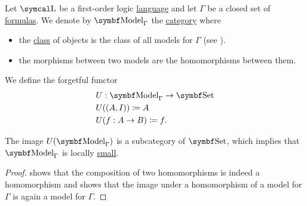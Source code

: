 \begin{definition}\label{def:first_order_model_category}
  Let \( \CL \) be a first-order logic \hyperref[def:first_order_logic_language]{language} and let \( \Gamma \) be a closed set of \hyperref[def:first_order_theory]{formulas}. We denote by \( \Cat{Model}_\Gamma \) the \hyperref[def:category]{category} where
  \begin{itemize}
    \item the \hyperref[def:set_zfc]{class} of objects is the class of all models for \( \Gamma \) (see ).
    \item the morphisms between two models are the homomorphisms between them.
  \end{itemize}

  We define the forgetful functor
  \begin{align*}
    &U: \Cat{Model}_\Gamma \to \Cat{Set} \\
    &U((A, I)) \coloneqq A \\
    &U(f: A \to B) \coloneqq f.
  \end{align*}

  The image \( U(\Cat{Model}_\Gamma) \) is a subcategory of \( \Cat{Set} \), which implies that \( \Cat{Model}_\Gamma \) is locally \hyperref[def:category_cardinality]{small}.
\end{definition}
\begin{proof}
   shows that the composition of two homomorphisms is indeed a homomorphism and  shows that the image under a homomorphism of a model for \( \Gamma \) is again a model for \( \Gamma \).
\end{proof}

